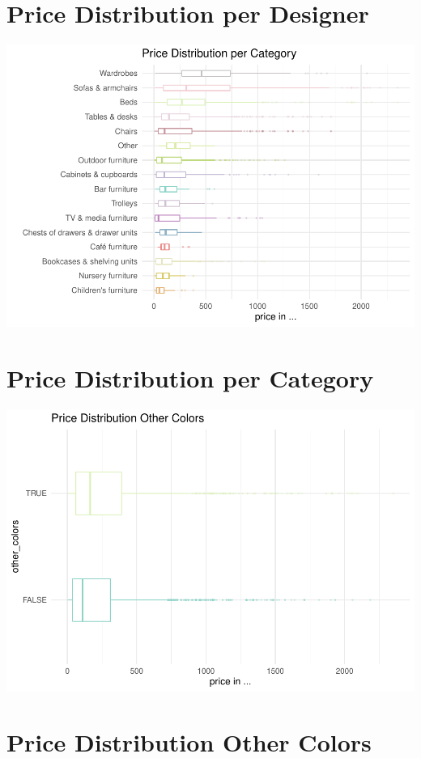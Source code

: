 \documentclass[a4paper, nobind]{templates/ociamthesis}
\begin{document}
\hypertarget{price_distribution_designer}{%
\section{Price Distribution per Designer}\label{price_distribution_designer}}

\includegraphics{_main_files/figure-latex/unnamed-chunk-6-1.pdf}

\hypertarget{price_distribution_category}{%
\section{Price Distribution per Category}\label{price_distribution_category}}

\includegraphics{_main_files/figure-latex/unnamed-chunk-7-1.pdf}

\hypertarget{price_distribution_other_colors}{%
\section{Price Distribution Other Colors}\label{price_distribution_other_colors}}
\end{document}

